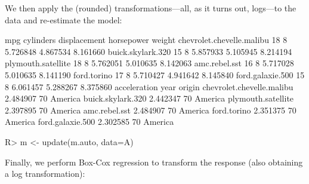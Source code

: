 \documentclass[
]{jss}
\begin{document}
We then apply the (rounded) transformations---all, as it turns out,
logs---to the data and re-estimate the model:

\begin{CodeChunk}
\begin{CodeOutput}
                          mpg cylinders displacement horsepower   weight
chevrolet.chevelle.malibu  18         8     5.726848   4.867534 8.161660
buick.skylark.320          15         8     5.857933   5.105945 8.214194
plymouth.satellite         18         8     5.762051   5.010635 8.142063
amc.rebel.sst              16         8     5.717028   5.010635 8.141190
ford.torino                17         8     5.710427   4.941642 8.145840
ford.galaxie.500           15         8     6.061457   5.288267 8.375860
                          acceleration year  origin
chevrolet.chevelle.malibu     2.484907   70 America
buick.skylark.320             2.442347   70 America
plymouth.satellite            2.397895   70 America
amc.rebel.sst                 2.484907   70 America
ford.torino                   2.351375   70 America
ford.galaxie.500              2.302585   70 America
\end{CodeOutput}
\begin{CodeInput}
R> m <- update(m.auto, data=A)
\end{CodeInput}
\end{CodeChunk}

Finally, we perform Box-Cox regression to transform the response (also
obtaining a log transformation):
\end{document}
